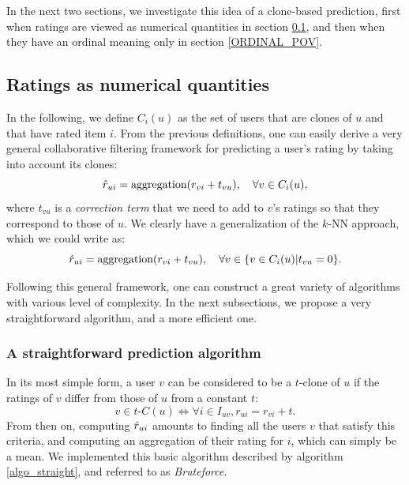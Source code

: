 In the next two sections, we investigate this idea of a clone-based prediction,
first when ratings are viewed as numerical quantities in section
\ref{NUMERICAL_POV}, and then when they have an ordinal meaning only in
section \ref{ORDINAL_POV}.

\subsection{Ratings as numerical quantities}
\label{NUMERICAL_POV}

In the following, we define $C_i(u)$ as the set of users that are clones of $u$
and that have rated item $i$.  From the previous definitions, one can easily
derive a very general collaborative filtering framework for predicting a user's
rating by taking into account its clones:
$$\hat{r}_{ui} = \text{aggregation}(r_{vi} + t_{vu}), \quad \forall v \in
C_i(u),$$
where $t_{vu}$ is a \textit{correction term} that we need to add to $v$'s
ratings so that they correspond to those of $u$. We clearly have a
generalization of the $k$-NN approach, which we could write as:
$$\hat{r}_{ui} = \text{aggregation}(r_{vi} + t_{vu}), \quad \forall v \in \{v \in C_i(u)
  | t_{vu} = 0\}.$$

Following this general framework, one can construct a great variety of
algorithms with various level of complexity. In the next subsections, we
propose a very straightforward algorithm, and a more efficient one.

\subsubsection{A straightforward prediction algorithm}
\label{STRAIGHTFORWARD}

In its most simple form, a user $v$ can be considered to be a $t$-clone of $u$ if
the ratings of $v$ differ from those of $u$ from a constant $t$:
\begin{equation}
v \in t\text{-}C(u) \iff \forall i \in I_{uv}, r_{ui} = r_{vi} + t.
\end{equation}
From then on, computing $\hat{r}_{ui}$ amounts to finding all the users $v$ that
satisfy this criteria, and computing an aggregation of their rating for $i$,
which can simply be a mean. We implemented this basic algorithm described by
algorithm \ref{algo_straight}, and referred to as \textit{Bruteforce}.

